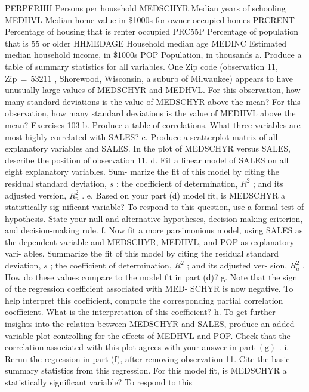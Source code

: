 \documentclass[11pt]{article}
\begin{document}
PERPERHH Persons per household
MEDSCHYR Median years of schooling
MEDHVL Median home value in \$1000s for owner-occupied homes
PRCRENT Percentage of housing that is renter occupied
PRC55P Percentage of population that is 55 or older
HHMEDAGE Household median age
MEDINC Estimated median household income, in \$1000s
POP Population, in thousands
a. Produce a table of summary statistics for all variables. One Zip code
(observation 11, \(\mathrm{Z i p} \,=\, 5 3 2 1 1\) , Shorewood, Wisconsin, a suburb of
Milwaukee) appears to have unusually large values of MEDSCHYR
 and MEDHVL. For this observation, how many standard deviations is
the value of MEDSCHYR above the mean? For this observation, how
 many standard deviations is the value of MEDHVL above the mean?
 Exercises 103
b. Produce a table of correlations. What three variables are most highly
correlated with SALES?
 c. Produce a scatterplot matrix of all explanatory variables and SALES.
In the plot of MEDSCHYR versus SALES, describe the position of
observation 11.
 d. Fit a linear model of SALES on all eight explanatory variables. Sum-
 marize the fit of this model by citing the residual standard deviation, \(s\) :
 the coefficient of determination, \(R^{2}\) ; and its adjusted version, \(R_{a}^{2}\) .
e. Based on your part (d) model fit, is MEDSCHYR a statistically sig
nificant variable? To respond to this question, use a formal test of
 hypothesis. State your null and alternative hypotheses, decision-making
criterion, and decision-making rule.
f. Now fit a more parsimonious model, using SALES as the dependent
variable and MEDSCHYR, MEDHVL, and POP as explanatory vari-
ables. Summarize the fit of this model by citing the residual standard
deviation, \(s\) ; the coefficient of determination, \(R^{2}\) ; and its adjusted ver-
sion, \(R_{a}^{2}\) . How do these values compare to the model fit in part (d)?
g. Note that the sign of the regression coefficient associated with MED-
SCHYR is now negative. To help interpret this coefficient, compute the
corresponding partial correlation coefficient. What is the interpretation
of this coefficient?
h. To get further insights into the relation between MEDSCHYR and
SALES, produce an added variable plot controlling for the effects of
MEDHVL and POP. Check that the correlation associated with this
 plot agrees with your answer in part \(\mathrm{( g )}\) .
i. Rerun the regression in part (f), after removing observation 11. Cite
the basic summary statistics from this regression. For this model fit,
is MEDSCHYR a statistically significant variable? To respond to this
\end{document}
